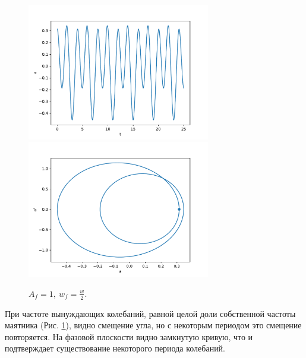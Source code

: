            \begin{figure}[H]
                \centering
                \includegraphics[width=8cm]{pictures/4resonance2.pdf}
                \includegraphics[width=8cm]{pictures/4resonance2p.pdf}
                \caption{$A_f = 1, ~ w_f = \frac{w}{2}$.} \label{w05w}
            \end{figure}
            При частоте вынуждающих колебаний, равной целой доли собственной частоты маятника (Рис. \ref{w05w}), видно смещение угла, но с некоторым периодом это смещение повторяется. На фазовой плоскости видно замкнутую кривую, что и подтверждает существование некоторого периода колебаний.

